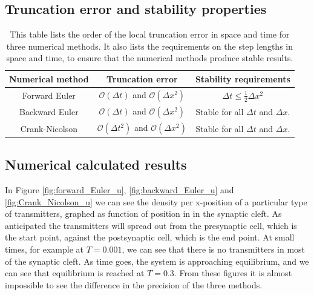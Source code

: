 \documentclass[12pt]{article}
\begin{document}
\begin{flushleft}
\subsection{Truncation error and stability properties}

\begin{table}[!h]
\begin{center}
\begin{tabular}{| c | c | c |}
	\hline
	\textbf{Numerical method} & \textbf{Truncation error} & \textbf{Stability requirements}\\
	\hline	
	Forward Euler & $\mathcal{O}(\Delta t)$ and $\mathcal{O}(\Delta x^2)$ & $\Delta t \leq \frac{1}{2}\Delta x^2$ \\
		Backward Euler & $\mathcal{O}(\Delta t)$ and $\mathcal{O}(\Delta x^2)$ & Stable for all $\Delta t$ and $\Delta x$.\\
			Crank-Nicolson & $\mathcal{O}(\Delta t^2)$ and $\mathcal{O}(\Delta x^2)$ & Stable for all $\Delta t$ and $\Delta x$.\\
  \hline
\end{tabular}
\end{center}
\caption{\label{tab:error_stability}This table lists the order of the local truncation error in space and time for three numerical methods. It also lists the requirements on the step lengths in space and time, to ensure that the numerical methods produce stable results.}
\end{table}

\subsection{Numerical calculated results}
In Figure \ref{fig:forward_Euler_u}, \ref{fig:backward_Euler_u} and \ref{fig:Crank_Nicolson_u} we can see the density per x-position of a particular type of transmitters, graphed as function of position in in the synaptic cleft. As anticipated the transmitters will spread out from the presynaptic cell, which is the start point, against the postsynaptic cell, which is the end point. At small times, for example at $T = 0.001$, we can see that there is no transmitters in most of the synaptic cleft. As time goes, the system is approaching equilibrium, and we can see that equilibrium is reached at $T = 0.3$. From these figures it is almost impossible to see the difference in the precision of the three methods.


\end{flushleft}
\end{document}
